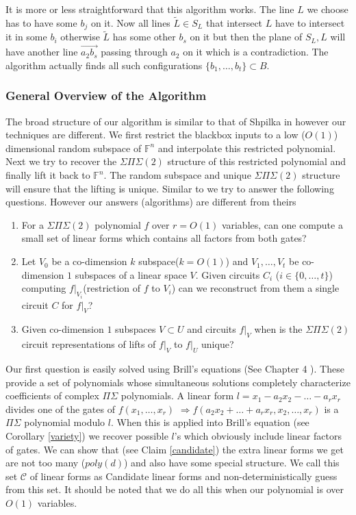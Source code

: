 \documentclass[letterpaper,USenglish,numberwithinsect]{lipics}
\newcommand{\F}{\mathbb{F}}
\newcommand{\MC}{\mathcal{C}}
\begin{document}
It is more or less straightforward that this algorithm works. The line $L$ we choose has to have some $b_j$ on it.
Now all lines $\tilde L \in S_L$ that intersect $L$ have to intersect it in some $b_i$ otherwise $\tilde{L}$ has
some other $b_s$ on it but then the plane of $S_L,L$ will have another line $\overrightarrow{a_2b_s}$ passing through
$a_2$ on it which is a contradiction. The algorithm actually finds all such configurations $\{b_1,\ldots,b_t\}\subset B$.


\subsubsection{General Overview of the Algorithm}
The broad structure of our algorithm is similar to that of Shpilka in \cite{Shpilka07} however our
techniques are different. We first restrict the blackbox inputs to a low ($O(1)$) dimensional random subspace of
$\F^n$ and interpolate this restricted polynomial. Next we try to recover the $\Sigma\Pi\Sigma(2)$ structure
of this restricted polynomial and finally lift it back to $\F^n$. The random subspace and unique $\Sigma\Pi\Sigma(2)$
structure will ensure that the lifting is unique. Similar to \cite{Shpilka07} we try to answer the following questions.
However our answers (algorithms) are different from theirs

\begin{enumerate}
\item For a $\Sigma\Pi\Sigma(2)$ polynomial $f$ over $r=O(1)$ variables, can one compute a small set of linear forms which contains all factors
from both gates?
 \item Let $V_0$ be a co-dimension $k$ subspace($k=O(1)$) and $V_1,\ldots,V_t$ be co-dimension $1$ subspaces of a linear space $V$.
 Given circuits $C_i$ ($i\in\{0,\ldots,t\}$) computing $f|_{V_i}$(restriction of $f$ to $V_i$) can we reconstruct from them a single
 circuit $C$ for $f|_{V}$?
 \item Given co-dimension $1$ subspaces $V \subset U$ and circuits $f|_{V}$ when is the $\Sigma\Pi\Sigma(2)$ circuit
 representations of lifts of $f|_{V}$ to $f|_{U}$ unique?
\end{enumerate}


Our first question is easily solved using Brill's equations (See Chapter 4 \cite{GKZ94}). These provide a set of polynomials whose simultaneous
solutions completely characterize coefficients of complex $\Pi\Sigma$ polynomials. A linear form $l = x_1-a_2x_2-\ldots-a_rx_r$ divides one of
the gates of $f(x_1,\ldots,x_r)$
$\Rightarrow f(a_2x_2+\ldots+a_rx_r,x_2,\ldots,x_r)$ is a $\Pi\Sigma$ polynomial modulo $l$. When this is applied into Brill's equation
(see Corollary \ref{variety})
we recover possible $l$'s which obviously
include linear factors of gates. We can show that (see Claim \ref{candidate}) the extra linear forms we get are not too many ($poly(d)$) and
also have some special structure. We call
this set $\MC$ of linear forms as Candidate linear forms and non-deterministically guess from this set. It should be noted
that we do all this when our polynomial is over $O(1)$ variables.
\end{document}
